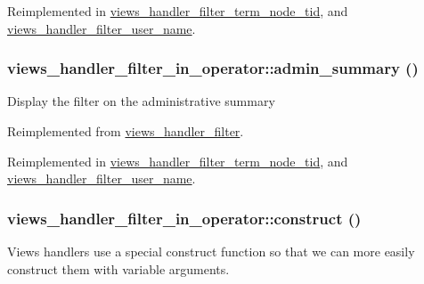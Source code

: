 Reimplemented in \hyperlink{classviews__handler__filter__term__node__tid_75f38674ff356981f6e77f009da2101a}{views\_\-handler\_\-filter\_\-term\_\-node\_\-tid}, and \hyperlink{classviews__handler__filter__user__name_a6ae18031b13da1c92d83b8c5de74c15}{views\_\-handler\_\-filter\_\-user\_\-name}.\hypertarget{classviews__handler__filter__in__operator_2c17bde9b5cb3498d31786ba888d545c}{
\subsubsection[{admin\_\-summary}]{\setlength{\rightskip}{0pt plus 5cm}views\_\-handler\_\-filter\_\-in\_\-operator::admin\_\-summary ()}}
\label{classviews__handler__filter__in__operator_2c17bde9b5cb3498d31786ba888d545c}


Display the filter on the administrative summary 

Reimplemented from \hyperlink{classviews__handler__filter_655263cd0b73188eec064b9a9743fe4c}{views\_\-handler\_\-filter}.

Reimplemented in \hyperlink{classviews__handler__filter__term__node__tid_392046588b13b1b76223eb22ba4ff660}{views\_\-handler\_\-filter\_\-term\_\-node\_\-tid}, and \hyperlink{classviews__handler__filter__user__name_ba7659d0d6c937d9c346e8ed3af532b6}{views\_\-handler\_\-filter\_\-user\_\-name}.\hypertarget{classviews__handler__filter__in__operator_1ec0f531f2c590ef15468ae06c5d0284}{
\subsubsection[{construct}]{\setlength{\rightskip}{0pt plus 5cm}views\_\-handler\_\-filter\_\-in\_\-operator::construct ()}}
\label{classviews__handler__filter__in__operator_1ec0f531f2c590ef15468ae06c5d0284}


Views handlers use a special construct function so that we can more easily construct them with variable arguments. 

